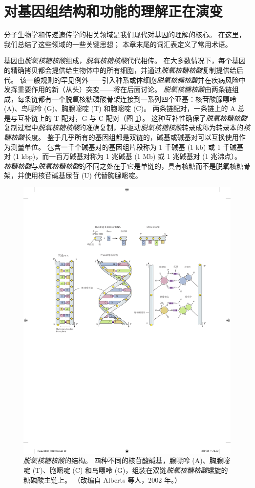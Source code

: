\section{对基因组结构和功能的理解正在演变}
分子生物学和传递遗传学的相关领域是我们现代对基因的理解的核心。 
在这里，我们总结了这些领域的一些关键思想； 本章末尾的词汇表定义了常用术语。


基因由\textit{脱氧核糖核酸}组成，\textit{脱氧核糖核酸}代代相传。 
在大多数情况下，每个基因的精确拷贝都会提供给生物体中的所有细胞，并通过\textit{脱氧核糖核酸}复制提供给后代。 
该一般规则的罕见例外——引入种系或体细胞\textit{脱氧核糖核酸}并在疾病风险中发挥重要作用的新（从头）突变——将在后面讨论。 \textit{脱氧核糖核酸}由两条链组成，每条链都有一个脱氧核糖磷酸骨架连接到一系列四个亚基：核苷酸腺嘌呤 (A)、鸟嘌呤 (G)、胸腺嘧啶 (T) 和胞嘧啶 (C)。 
两条链配对，一条链上的 A 总是与互补链上的 T 配对，G 与 C 配对（图 \ref{fig:2_2}）。 
这种互补性确保了\textit{脱氧核糖核酸}复制过程中\textit{脱氧核糖核酸}的准确复制，并驱动\textit{脱氧核糖核酸}转录成称为转录本的\textit{核糖核酸}长度。 
鉴于几乎所有的基因组都是双链的，碱基或碱基对可以互换使用作为测量单位。 
包含一千个碱基对的基因组片段称为 1 千碱基 (1 kb) 或 1 千碱基对 (1 kbp)，而一百万碱基对称为 1 兆碱基 (1 Mb) 或 1 兆碱基对 (1 兆沸点）。 
\textit{核糖核酸}与\textit{脱氧核糖核酸}的不同之处在于它是单链的，具有核糖而不是脱氧核糖骨架，并使用核苷碱基尿苷 (U) 代替胸腺嘧啶。

\begin{figure}[htbp]
	\centering
	\includegraphics[width=0.5\linewidth]{chap02/fig_2_2}
	\caption{\textit{脱氧核糖核酸}的结构。 
		四种不同的核苷酸碱基，腺嘌呤 (A)、胸腺嘧啶 (T)、胞嘧啶 (C) 和鸟嘌呤 (G)，组装在双链\textit{脱氧核糖核酸}螺旋的糖磷酸主链上。 
		（改编自 Alberts 等人，2002 年。）}
	\label{fig:2_2}
\end{figure}


